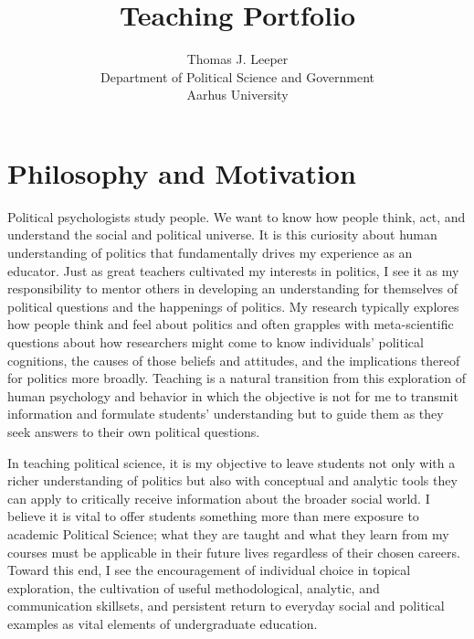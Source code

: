 \documentclass[12pt]{article}
\begin{document}
\title{Teaching Portfolio}
\author{Thomas J. Leeper\\
Department of Political Science and Government\\
Aarhus University}

\maketitle

\tableofcontents
\clearpage

\section{Philosophy and Motivation}
Political psychologists study people. We want to know how people think, act, and understand the social and political universe. It is this curiosity about human understanding of politics that fundamentally drives my experience as an educator. Just as great teachers cultivated my interests in politics, I see it as my responsibility to mentor others in developing an understanding for themselves of political questions and the happenings of politics. My research typically explores how people think and feel about politics and often grapples with meta-scientific questions about how researchers might come to know individuals' political cognitions, the causes of those beliefs and attitudes, and the implications thereof for politics more broadly. Teaching is a natural transition from this exploration of human psychology and behavior in which the objective is not for me to transmit information and formulate students' understanding but to guide them as they seek answers to their own political questions.

In teaching political science, it is my objective to leave students not only with a richer understanding of politics but also with conceptual and analytic tools they can apply to critically receive information about the broader social world. I believe it is vital to offer students something more than mere exposure to academic Political Science; what they are taught and what they learn from my courses must be applicable in their future lives regardless of their chosen careers. Toward this end, I see the encouragement of individual choice in topical exploration, the cultivation of useful methodological, analytic, and communication skillsets, and persistent return to everyday social and political examples as vital elements of undergraduate education. %
\end{document}
